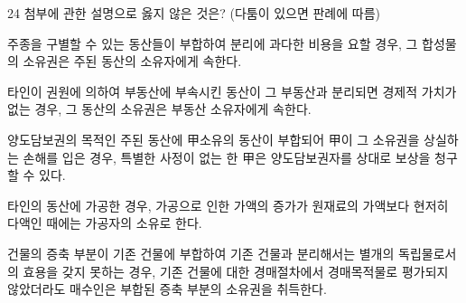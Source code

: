 \begin{question}{24}
첨부에 관한 설명으로 옳지 않은 것은? (다툼이 있으면 판례에 따름)
\begin{choices}
  \item 주종을 구별할 수 있는 동산들이 부합하여 분리에 과다한 비용을 요할 경우, 그 합성물의 소유권은 주된 동산의 소유자에게 속한다.
  \item 타인이 권원에 의하여 부동산에 부속시킨 동산이 그 부동산과 분리되면 경제적 가치가 없는 경우, 그 동산의 소유권은 부동산 소유자에게 속한다.
  \item 양도담보권의 목적인 주된 동산에 甲소유의 동산이 부합되어 甲이 그 소유권을 상실하는 손해를 입은 경우, 특별한 사정이 없는 한 甲은 양도담보권자를 상대로 보상을 청구할 수 있다.
  \item 타인의 동산에 가공한 경우, 가공으로 인한 가액의 증가가 원재료의 가액보다 현저히 다액인 때에는 가공자의 소유로 한다.
  \item 건물의 증축 부분이 기존 건물에 부합하여 기존 건물과 분리해서는 별개의 독립물로서의 효용을 갖지 못하는 경우, 기존 건물에 대한 경매절차에서 경매목적물로 평가되지 않았더라도 매수인은 부합된 증축 부분의 소유권을 취득한다.
\end{choices}
\end{question}
